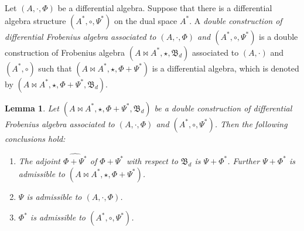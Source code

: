 \documentclass[10pt,a4paper]{amsart}
\numberwithin{equation}{section}
\newtheorem{Lemma}[Theorem]{Lemma}
\begin{document}
\begin{Definition}
 Let $(A, \cdot, \Phi)$ be a differential algebra.
 Suppose that there is a differential algebra structure $(A^*, \circ, \Psi^*)$ on the dual space $A^{*}$.
 A \textit{double construction of differential Frobenius algebra associated to $(A, \cdot, \Phi)$ and $(A^*, \circ, \Psi^*)$} is
 a double construction of Frobenius algebra $(A \bowtie A^*,\allowbreak \star, \mathfrak{B}_d)$
 associated to $(A, \cdot)$ and $(A^*, \circ)$
 such that $(A \bowtie A^*, \star, \Phi + \Psi^*)$ is a differential algebra,
 which is denoted by $(A \bowtie A^*, \star, \Phi + \Psi^*, \mathfrak{B}_d)$.
\end{Definition}

\begin{Lemma}\label{lem:douadm}
 Let $(A \bowtie A^*, \star, \Phi + \Psi^*, \mathfrak{B}_d)$ be a double construction of differential Frobenius algebra associated to $(A, \cdot, \Phi)$ and $(A^*, \circ, \Psi^*)$. Then the following conclusions hold:
 \begin{enumerate}\itemsep=0pt
 \item[$(1)$] The adjoint $\widehat{\Phi + \Psi^*}$ of $\Phi + \Psi^*$ with respect to $\mathfrak{B}_d$ is $\Psi + \Phi^*$.
 Further $\Psi + \Phi^*$ is admissible to $(A \bowtie A^*,\star, \Phi + \Psi^*)$.
 \item[$(2)$] $\Psi$ is admissible to $(A, \cdot, \Phi)$.
 \item[$(3)$] $\Phi^*$ is admissible to $(A^*, \circ, \Psi^*)$.
 \end{enumerate}
\end{Lemma}
\end{document}
